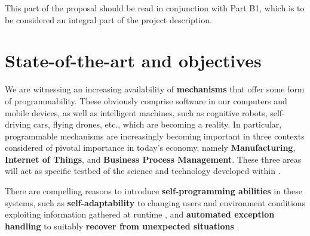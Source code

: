 This part of the proposal should be read in conjunction with Part B1,
which is to be considered an integral part of the project description. 


\section{State-of-the-art and objectives}





We are witnessing an increasing availability of \textbf{mechanisms}
that offer some form of programmability.  These obviously comprise
software in our computers and mobile devices, as well as intelligent
machines, such as cognitive robots, self-driving cars, flying drones,
etc., which are becoming a reality.
In particular, programmable mechanisms are increasingly becoming
important in three contexts considered of pivotal importance in
today's economy,
namely \textbf{Manufacturing}, \textbf{Internet of Things},
and \textbf{Business Process Management}.  These three areas will act
as specific testbed of the science and technology developed within
\project.


There are compelling reasons to introduce
\textbf{self-programming abilities} in these systems, such as
\textbf{self-adaptability} to changing users and environment
conditions exploiting information gathered at runtime
\cite{Seiger2016},  
and
\textbf{automated exception handling} to
suitably \textbf{recover from unexpected situations}
\cite{MarrellaMS17}. 




